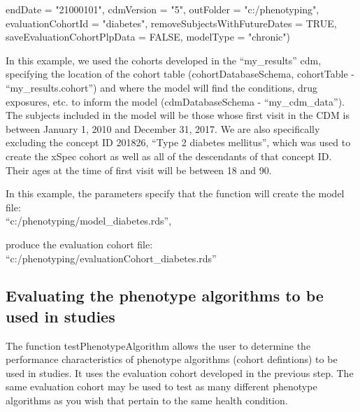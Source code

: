 \documentclass[
]{article}
\newenvironment{Shaded}{\begin{snugshade}}{\end{snugshade}}
\newcommand{\DataTypeTok}[1]{\textcolor[rgb]{0.13,0.29,0.53}{#1}}
\newcommand{\NormalTok}[1]{#1}
\newcommand{\OtherTok}[1]{\textcolor[rgb]{0.56,0.35,0.01}{#1}}
\newcommand{\StringTok}[1]{\textcolor[rgb]{0.31,0.60,0.02}{#1}}
\begin{document}
\begin{Shaded}
\begin{Highlighting}[]
                                   \DataTypeTok{endDate =} \StringTok{"21000101"}\NormalTok{,}
                                   \DataTypeTok{cdmVersion =} \StringTok{"5"}\NormalTok{,}
                                   \DataTypeTok{outFolder =} \StringTok{"c:/phenotyping"}\NormalTok{,}
                                   \DataTypeTok{evaluationCohortId =} \StringTok{"diabetes"}\NormalTok{,}
                                   \DataTypeTok{removeSubjectsWithFutureDates =} \OtherTok{TRUE}\NormalTok{,}
                                   \DataTypeTok{saveEvaluationCohortPlpData =} \OtherTok{FALSE}\NormalTok{,}
                                   \DataTypeTok{modelType =} \StringTok{"chronic"}\NormalTok{)}
\end{Highlighting}
\end{Shaded}

In this example, we used the cohorts developed in the ``my\_results''
cdm, specifying the location of the cohort table (cohortDatabaseSchema,
cohortTable - ``my\_results.cohort'') and where the model will find the
conditions, drug exposures, etc. to inform the model (cdmDatabaseSchema
- ``my\_cdm\_data''). The subjects included in the model will be those
whose first visit in the CDM is between January 1, 2010 and December 31,
2017. We are also specifically excluding the concept ID 201826, ``Type 2
diabetes mellitus'', which was used to create the xSpec cohort as well
as all of the descendants of that concept ID. Their ages at the time of
first visit will be between 18 and 90.

In this example, the parameters specify that the function will create
the model file:\\
``c:/phenotyping/model\_diabetes.rds'',

produce the evaluation cohort file:\\
``c:/phenotyping/evaluationCohort\_diabetes.rds''

\hypertarget{evaluating-the-phenotype-algorithms-to-be-used-in-studies}{%
\subsection{Evaluating the phenotype algorithms to be used in
studies}\label{evaluating-the-phenotype-algorithms-to-be-used-in-studies}}

The function testPhenotypeAlgorithm allows the user to determine the
performance characteristics of phenotype algorithms (cohort defintions)
to be used in studies. It uses the evaluation cohort developed in the
previous step. The same evaluation cohort may be used to test as many
different phenotype algorithms as you wish that pertain to the same
health condition.
\end{document}
